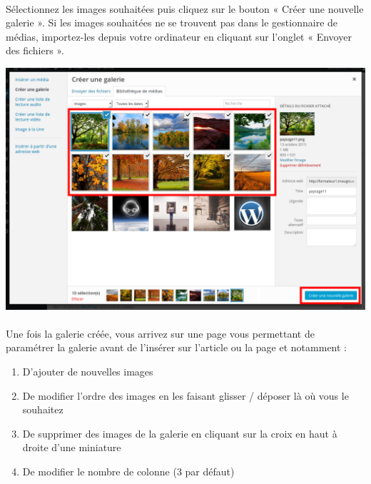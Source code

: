 \documentclass[10pt,a4paper]{article}
\begin{document}
\paragraph{}Sélectionnez les images souhaitées puis cliquez sur le bouton « Créer une nouvelle galerie ». Si les images souhaitées ne se trouvent pas dans le gestionnaire de médias, importez-les depuis votre ordinateur en cliquant sur l'onglet « Envoyer des fichiers ».
\begin{center}
\includegraphics[scale=0.25]{img/0115.png}
\end{center}
\paragraph{}Une fois la galerie créée, vous arrivez sur une page vous permettant de paramétrer la galerie avant de l'insérer sur l'article ou la page et notamment :
\begin{enumerate}
\item D'ajouter de nouvelles images
\item De modifier l'ordre des images en les faisant glisser / déposer là où vous le souhaitez
\item De supprimer des images de la galerie en cliquant sur la croix en haut à droite d'une miniature
\item De modifier le nombre de colonne (3 par défaut)
\end{enumerate}
\end{document}
